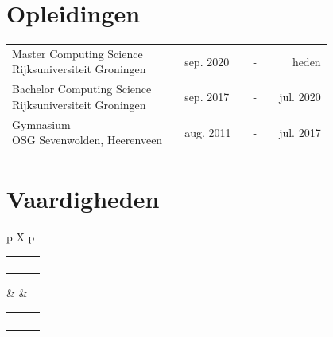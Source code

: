 \documentclass[paper=a4,12pt]{article}
\newcommand{\skill}[1]{%
    \foreach \x in {1,...,5}{%
        \ifnum \x > #1 {\color[HTML]{E0E0E0}\huge$\bullet$} 
        \else {\color{SteelBlue}\huge$\bullet$}
        \fi
    }%
}
\newcommand{\sepspace}{\vspace*{0.5em}}		%
\begin{document}
\sepspace


\section*{Opleidingen}
\begin{tabularx}{\linewidth}{lXlcr}
    \makecell[tl]{\large Master Computing Science\\\color{gray} Rijksuniversiteit Groningen} & & sep. 2020 & ~~-~~ & heden \\
    \rule{0pt}{0.69cm}\makecell[tl]{\large Bachelor Computing Science\\\color{gray} Rijksuniversiteit Groningen} & & sep. 2017 & ~~-~~ & jul. 2020 \\
    \rule{0pt}{0.69cm}\makecell[tl]{\large Gymnasium\\\color{gray} OSG Sevenwolden, Heerenveen} & & aug. 2011 & ~~-~~ & jul. 2017 \\
\end{tabularx}

\sepspace


\section*{Vaardigheden}
\begin{tabularx}{\linewidth}{p{\hlwmpad} X p{\hlwmpad}}
    {\begin{tabularx}{\linewidth}[t]{l X r@{\hspace{-4pt}}}
        \adjustbox{valign=t}{\large Java} & & \adjustbox{valign=t}{\skill{4}}
        \\
        \rule{0pt}{0.69cm}\adjustbox{valign=t}{\large Kotlin} & & \adjustbox{valign=t}{\skill{4}}
        \\
        \rule{0pt}{0.69cm}\adjustbox{valign=t}{\large JavaScript} & & \adjustbox{valign=t}{\skill{4}}
        \\
        \rule{0pt}{0.69cm}\adjustbox{valign=t}{\large Python} & & \adjustbox{valign=t}{\skill{3}}
        \\
    \end{tabularx}}
    & &
    {\begin{tabularx}{\linewidth}[t]{l X r@{\hspace{-4pt}}}
        \adjustbox{valign=t}{\large Docker} & & \adjustbox{valign=t}{\skill{3}}
        \\
        \rule{0pt}{0.69cm}\adjustbox{valign=t}{\large Kubernetes} & & \adjustbox{valign=t}{\skill{2}}
        \\
        \rule{0pt}{0.69cm}\adjustbox{valign=t}{\large Git} & & \adjustbox{valign=t}{\skill{3}}
        \\
        \rule{0pt}{0.69cm}\adjustbox{valign=t}{\large \LaTeX} & & \adjustbox{valign=t}{\skill{3}}
        \\
    \end{tabularx}}
    \\
\end{tabularx}
\end{document}
